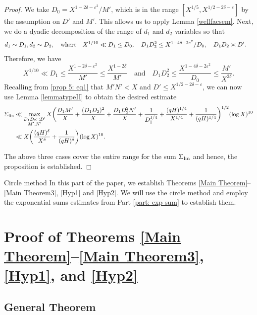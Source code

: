 \documentclass[12pt]{amsart}
\makeatletter
\renewcommand\part{\@startsection{part}{2}%
	\z@{0.5\linespacing\@plus2\linespacing}{\linespacing}%
	{\normalfont\large\scshape\bfseries\centering}}
\numberwithin{equation}{section}
\theoremstyle{remark}
\theoremstyle{definition}
\makeatother
\begin{document}
\begin{proof}
We take $D_0=X^{1-2\delta-\varepsilon^2}/M'$, which is in the range $[X^{1/5}, X^{1/2-2\delta-\varepsilon}]$ by the assumption on $D'$ and $M'$. This allows us to apply Lemma \ref{wellfacsem}. Next, we do a dyadic decomposition of the range of $d_1$ and $d_2$ variables so that 
\begin{align}
\notag & d_1\sim D_1, d_2\sim D_2, \quad \text{where}\quad X^{1/10} \ll D_1\leq D_0, \quad D_1D_2^2 \leq X^{1-4\delta-2\varepsilon^2}/D_0, \quad D_1D_2\asymp D'.
\end{align}
Therefore, we have 
\[X^{1/10} \ll D_1 \leq \dfrac{X^{1-2\delta-\varepsilon^2}}{M'} \leq \dfrac{X^{1-2\delta}}{M'} \quad \text{and}\quad D_1D_2^2\leq \dfrac{X^{1-4\delta-2\varepsilon^2}}{D_0} \leq \dfrac{ M'}{X^{2\delta}}.\]
Recalling from \eqref{prop 5: eq1} that $M'N'< X$ and $D'\leq X^{1/2-2\delta-\varepsilon}$, we can now use Lemma \ref{lemmatypeII} to obtain the desired estimate
\begin{align}
\notag \Sigma_{\textup{lin}} & \ll  \max_{\substack{D_1D_2\asymp D'\\M', N'}}X\bigg(\dfrac{D_1M'}{X} + \dfrac{(D_1D_2)^2}{X} + \dfrac{D_1D_2^2N'}{X} + \dfrac{1}{D_1^{1/4}} + \dfrac{(qH)^{1/4}}{X^{1/4}}+ \dfrac{1}{(qH)^{1/4}}\bigg)^{1/2}(\log X)^{10}\\
\notag & \ll  X\bigg(\dfrac{(qH)^\delta}{X^\delta} + \dfrac{1}{(qH)^\delta}\bigg)(\log X)^{10}.
\end{align}


The above three cases cover the entire range for the sum $\Sigma_{\textup{lin}}$ and hence, the proposition is established.
\end{proof}


\part{Circle method}\label{part: circle}
In this part of the paper, we establish Theorems \ref{Main Theorem}--\ref{Main Theorem3}, \ref{Hyp1} and \ref{Hyp2}. We will use the circle method and employ the exponential sums estimates from Part \ref{part: exp sum} to establish them.


\section{Proof of Theorems \ref{Main Theorem}--\ref{Main Theorem3}, \ref{Hyp1}, and \ref{Hyp2} }\label{mainproof}

\subsection{General Theorem}
\end{document}
